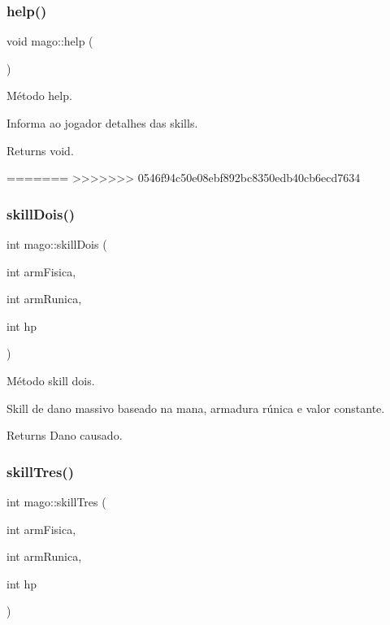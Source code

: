 \subsubsection{\texorpdfstring{help()}{help()}}
{\footnotesize\ttfamily void mago\+::help (\begin{DoxyParamCaption}{ }\end{DoxyParamCaption})}



Método help. 

Informa ao jogador detalhes das skills. \begin{DoxyReturn}{Returns}
void. 
\end{DoxyReturn}
=======
>>>>>>> 0546f94c50e08ebf892bc8350edb40cb6ecd7634
\mbox{\label{classmago_ac0a8309b459ab7f27f356eff72817c2f}} 
\subsubsection{\texorpdfstring{skill\+Dois()}{skillDois()}}
{\footnotesize\ttfamily int mago\+::skill\+Dois (\begin{DoxyParamCaption}\item[{int}]{arm\+Fisica,  }\item[{int}]{arm\+Runica,  }\item[{int}]{hp }\end{DoxyParamCaption})}



Método skill dois. 

Skill de dano massivo baseado na mana, armadura rúnica e valor constante. \begin{DoxyReturn}{Returns}
Dano causado. 
\end{DoxyReturn}
\mbox{\label{classmago_a77280ba40aac7fdf8766950261821a39}} 
\subsubsection{\texorpdfstring{skill\+Tres()}{skillTres()}}
{\footnotesize\ttfamily int mago\+::skill\+Tres (\begin{DoxyParamCaption}\item[{int}]{arm\+Fisica,  }\item[{int}]{arm\+Runica,  }\item[{int}]{hp }\end{DoxyParamCaption})}




